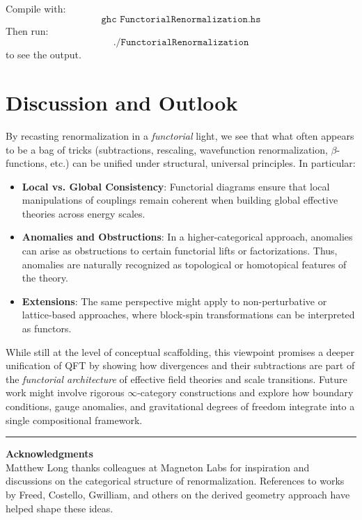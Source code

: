 \documentclass[12pt]{article}
\begin{document}
Compile with:
\[
\texttt{ghc FunctorialRenormalization.hs}
\]
Then run:
\[
\texttt{./FunctorialRenormalization}
\]
to see the output.

\vspace{1em}

\section{Discussion and Outlook}
By recasting renormalization in a \emph{functorial} light, we see that what often appears to be a bag of tricks 
(subtractions, rescaling, wavefunction renormalization, \(\beta\)-functions, etc.) can be unified under structural, 
universal principles. In particular:
\begin{itemize}
    \item \textbf{Local vs. Global Consistency}: Functorial diagrams ensure that local manipulations of couplings remain 
    coherent when building global effective theories across energy scales.
    \item \textbf{Anomalies and Obstructions}: In a higher-categorical approach, anomalies can arise as obstructions 
    to certain functorial lifts or factorizations. Thus, anomalies are naturally recognized as topological or homotopical 
    features of the theory.
    \item \textbf{Extensions}: The same perspective might apply to non-perturbative or lattice-based approaches, 
    where block-spin transformations can be interpreted as functors. 
\end{itemize}

While still at the level of conceptual scaffolding, this viewpoint promises a deeper unification of QFT 
by showing how divergences and their subtractions are part of the \emph{functorial architecture} of 
effective field theories and scale transitions. Future work might involve rigorous \(\infty\)-category constructions 
and explore how boundary conditions, gauge anomalies, and gravitational degrees of freedom integrate into 
a single compositional framework.

\vspace{1em}
\hrule
\vspace{1em}

\noindent\textbf{Acknowledgments} \\
Matthew Long thanks colleagues at Magneton Labs for inspiration and discussions on the categorical structure 
of renormalization. References to works by Freed, Costello, Gwilliam, and others on the derived geometry approach 
have helped shape these ideas.
\end{document}
